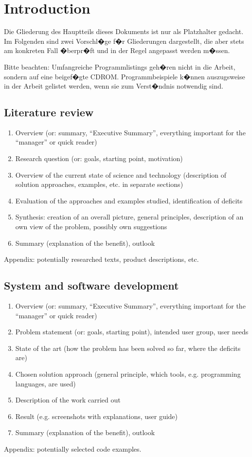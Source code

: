 \chapter{Introduction}
\label{sec:einl}

Die Gliederung des Hauptteils dieses Dokuments ist nur als Platzhalter gedacht. 
Im Folgenden sind zwei Vorschl�ge f�r Gliederungen dargestellt, die
aber stets am konkreten Fall �berpr�ft und in der Regel angepasst werden
m�ssen.

Bitte beachten: Umfangreiche Programmlistings geh�ren nicht in die Arbeit, 
sondern auf eine beigef�gte CDROM. Programmbeispiele k�nnen auszugsweise
in der Arbeit gelistet werden, wenn sie zum Verst�ndnis notwendig sind.

\section{Literature review}
\label{sec:gliederung-lit}
\begin{enumerate}
  \item Overview (or: summary, "`Executive Summary"', everything important for the "`manager"' or quick reader)
  \item Research question (or: goals, starting point, motivation)
  \item Overview of the current state of science and technology (description of solution approaches, examples, etc. in separate sections)
  \item Evaluation of the approaches and examples studied, identification of deficits
  \item Synthesis: creation of an overall picture, general principles, description of an own view of the problem, possibly own suggestions
  \item Summary (explanation of the benefit), outlook
\end{enumerate}
Appendix: potentially researched texts, product descriptions, etc.

\section{System and software development}
\label{sec:gliederung-sys}
\begin{enumerate}
  \item Overview (or: summary, "`Executive Summary"', everything important for the "`manager"' or quick reader)
  \item Problem statement (or: goals, starting point), intended user group, user needs
  \item State of the art (how the problem has been solved so far, where the deficits are)
  \item Chosen solution approach (general principle, which tools, e.g. programming languages, are used)
  \item Description of the work carried out
  \item Result (e.g. screenshots with explanations, user guide)
  \item Summary (explanation of the benefit), outlook
\end{enumerate}
Appendix: potentially selected code examples.

